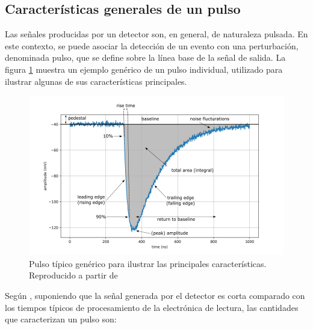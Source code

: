 \documentclass[]{book}
\begin{document}
\subsection{Características generales de un pulso}

\noindent Las señales producidas por un detector son, en general, de naturaleza pulsada. En este contexto, se puede asociar la detección de un evento con una perturbación, denominada pulso, que se define sobre la línea base de la señal de salida. La figura \ref{fig:pulse} muestra un ejemplo genérico de un pulso individual, utilizado para ilustrar algunas de sus características principales.\\

\begin{figure}[h]
    \centering
    \includegraphics[width=1.0\textwidth]{pulse_edited.png}
    \caption{Pulso típico genérico para ilustrar las principales características. Reproducido a partir de \cite{kolanoski2020particle}}
    \label{fig:pulse}

\end{figure}

\noindent Según \cite{knoll2010radiation}, suponiendo que la señal generada por el detector es corta comparado con los tiempos típicos de procesamiento de la electrónica de lectura, las cantidades que caracterizan un pulso son:
\end{document}
